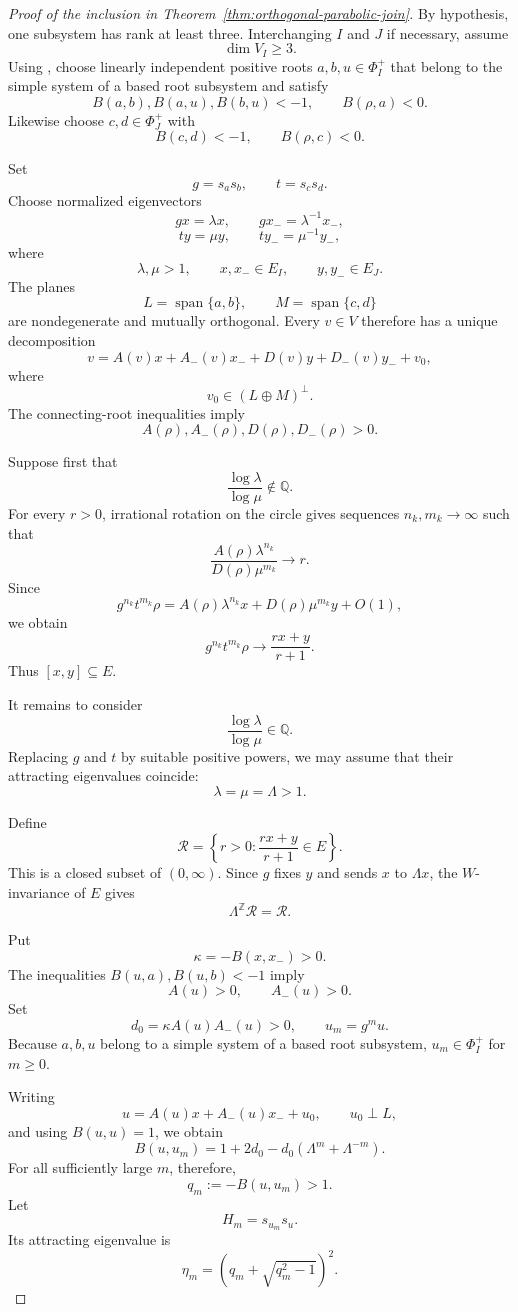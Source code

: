\documentclass[11pt,reqno]{amsart}
\theoremstyle{plain}
\theoremstyle{definition}
\theoremstyle{remark}
\numberwithin{equation}{section}
\begin{document}
\begin{proof}[Proof of the inclusion in
Theorem~\ref{thm:orthogonal-parabolic-join}]
By hypothesis, one subsystem has rank at least three.
Interchanging $I$ and $J$ if necessary, assume
\[
\dim V_I\ge3.
\]
Using \cite[Proposition~6.4]{DHR}, choose linearly independent
positive roots $a,b,u\in\Phi_I^+$ that belong to the simple system
of a based root subsystem and satisfy
\[
B(a,b),B(a,u),B(b,u)<-1,
\qquad B(\rho,a)<0.
\]
Likewise choose $c,d\in\Phi_J^+$ with
\[
B(c,d)<-1,\qquad B(\rho,c)<0.
\]

Set
\[
g=s_as_b,\qquad t=s_cs_d.
\]
Choose normalized eigenvectors
\[
gx=\lambda x,\qquad gx_-=\lambda^{-1}x_-,
\]
\[
ty=\mu y,\qquad ty_-=\mu^{-1}y_-,
\]
where
\[
\lambda,\mu>1,\qquad
x,x_-\in E_I,\qquad y,y_-\in E_J.
\]
The planes
\[
L=\operatorname{span}\{a,b\},
\qquad
M=\operatorname{span}\{c,d\}
\]
are nondegenerate and mutually orthogonal. Every $v\in V$
therefore has a unique decomposition
\[
v=A(v)x+A_-(v)x_-+D(v)y+D_-(v)y_-+v_0,
\]
where
\[
v_0\in(L\oplus M)^\perp.
\]
The connecting-root inequalities imply
\[
A(\rho),A_-(\rho),D(\rho),D_-(\rho)>0.
\]

Suppose first that
\[
\frac{\log\lambda}{\log\mu}\notin\mathbb Q.
\]
For every $r>0$, irrational rotation on the circle gives sequences
$n_k,m_k\to\infty$ such that
\[
\frac{A(\rho)\lambda^{n_k}}
     {D(\rho)\mu^{m_k}}
\longrightarrow r.
\]
Since
\[
g^{n_k}t^{m_k}\rho
=
A(\rho)\lambda^{n_k}x
+D(\rho)\mu^{m_k}y+O(1),
\]
we obtain
\[
\widehat{g^{n_k}t^{m_k}\rho}
\longrightarrow
\frac{rx+y}{r+1}.
\]
Thus $[x,y]\subseteq E$.

It remains to consider
\[
\frac{\log\lambda}{\log\mu}\in\mathbb Q.
\]
Replacing $g$ and $t$ by suitable positive powers, we may assume
that their attracting eigenvalues coincide:
\[
\lambda=\mu=\Lambda>1.
\]

Define
\[
\mathcal R
=
\left\{
r>0:\frac{rx+y}{r+1}\in E
\right\}.
\]
This is a closed subset of $(0,\infty)$. Since $g$ fixes $y$ and
sends $x$ to $\Lambda x$, the $W$-invariance of $E$ gives
\[
\Lambda^{\mathbb Z}\mathcal R=\mathcal R.
\]

Put
\[
\kappa=-B(x,x_-)>0.
\]
The inequalities $B(u,a),B(u,b)<-1$ imply
\[
A(u)>0,\qquad A_-(u)>0.
\]
Set
\[
d_0=\kappa A(u)A_-(u)>0,
\qquad
u_m=g^m u.
\]
Because $a,b,u$ belong to a simple system of a based root
subsystem, $u_m\in\Phi_I^+$ for $m\ge0$.

Writing
\[
u=A(u)x+A_-(u)x_-+u_0,
\qquad u_0\perp L,
\]
and using $B(u,u)=1$, we obtain
\[
B(u,u_m)
=
1+2d_0-d_0(\Lambda^m+\Lambda^{-m}).
\]
For all sufficiently large $m$, therefore,
\[
q_m:=-B(u,u_m)>1.
\]
Let
\[
H_m=s_{u_m}s_u.
\]
Its attracting eigenvalue is
\[
\eta_m=
\left(q_m+\sqrt{q_m^2-1}\right)^2.
\]


\end{proof}
\end{document}
